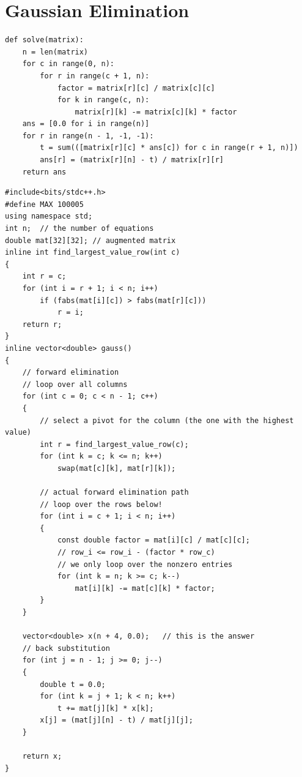 \documentclass[12pt]{book}
\begin{document}
\section{Gaussian Elimination}
\begin{verbatim}
def solve(matrix):
    n = len(matrix)
    for c in range(0, n):
        for r in range(c + 1, n):
            factor = matrix[r][c] / matrix[c][c]
            for k in range(c, n):
                matrix[r][k] -= matrix[c][k] * factor
    ans = [0.0 for i in range(n)]
    for r in range(n - 1, -1, -1):
        t = sum(([matrix[r][c] * ans[c]) for c in range(r + 1, n)])
        ans[r] = (matrix[r][n] - t) / matrix[r][r]
    return ans
\end{verbatim}
\begin{verbatim}
#include<bits/stdc++.h>
#define MAX 100005
using namespace std;
int n;	// the number of equations
double mat[32][32];	// augmented matrix
inline int find_largest_value_row(int c)
{
	int r = c;
	for (int i = r + 1; i < n; i++)
		if (fabs(mat[i][c]) > fabs(mat[r][c]))
			r = i;
	return r;
}
inline vector<double> gauss()
{
	// forward elimination
	// loop over all columns
	for (int c = 0; c < n - 1; c++)
	{
		// select a pivot for the column (the one with the highest value)
		int r = find_largest_value_row(c);
		for (int k = c; k <= n; k++)
			swap(mat[c][k], mat[r][k]);

		// actual forward elimination path
		// loop over the rows below!
		for (int i = c + 1; i < n; i++)
		{
			const double factor = mat[i][c] / mat[c][c];
			// row_i <= row_i - (factor * row_c)
			// we only loop over the nonzero entries
			for (int k = n; k >= c; k--)
				mat[i][k] -= mat[c][k] * factor;
		}
	}

	vector<double> x(n + 4, 0.0);	// this is the answer
	// back substitution
	for (int j = n - 1; j >= 0; j--)
	{
		double t = 0.0;
		for (int k = j + 1; k < n; k++)
			t += mat[j][k] * x[k];
		x[j] = (mat[j][n] - t) / mat[j][j];
	}

	return x;
}
\end{verbatim}
\end{document}
